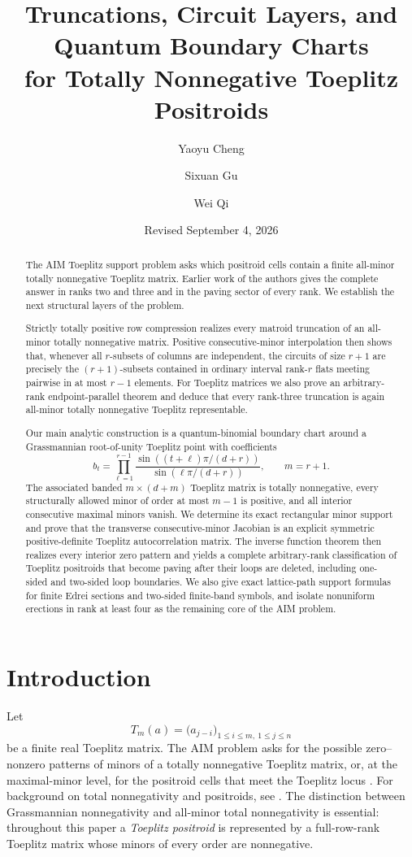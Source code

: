 \documentclass[11pt]{amsart}
\title[Toeplitz positroid truncations and charts]
{Truncations, Circuit Layers, and Quantum Boundary Charts\\
for Totally Nonnegative Toeplitz Positroids}
\author{Yaoyu Cheng}
\author{Sixuan Gu}
\author{Wei Qi}
\date{Revised September 4, 2026}
\theoremstyle{definition}
\theoremstyle{remark}
\begin{document}
\begin{abstract}
The AIM Toeplitz support problem asks which positroid cells contain a finite all-minor totally nonnegative Toeplitz matrix.  Earlier work of the authors gives the complete answer in ranks two and three and in the paving sector of every rank.  We establish the next structural layers of the problem.

Strictly totally positive row compression realizes every matroid truncation of an all-minor totally nonnegative matrix.  Positive consecutive-minor interpolation then shows that, whenever all $r$-subsets of columns are independent, the circuits of size $r+1$ are precisely the $(r+1)$-subsets contained in ordinary interval rank-$r$ flats meeting pairwise in at most $r-1$ elements.  For Toeplitz matrices we also prove an arbitrary-rank endpoint-parallel theorem and deduce that every rank-three truncation is again all-minor totally nonnegative Toeplitz representable.

Our main analytic construction is a quantum-binomial boundary chart around a Grassmannian root-of-unity Toeplitz point with coefficients
\[
 b_t=\prod_{\ell=1}^{r-1}\frac{\sin((t+\ell)\pi/(d+r))}{\sin(\ell\pi/(d+r))},
 \qquad m=r+1.
\]
The associated banded $m\times(d+m)$ Toeplitz matrix is totally nonnegative, every structurally allowed minor of order at most $m-1$ is positive, and all interior consecutive maximal minors vanish.  We determine its exact rectangular minor support and prove that the transverse consecutive-minor Jacobian is an explicit symmetric positive-definite Toeplitz autocorrelation matrix.  The inverse function theorem then realizes every interior zero pattern and yields a complete arbitrary-rank classification of Toeplitz positroids that become paving after their loops are deleted, including one-sided and two-sided loop boundaries.  We also give exact lattice-path support formulas for finite Edrei sections and two-sided finite-band symbols, and isolate nonuniform erections in rank at least four as the remaining core of the AIM problem.
\end{abstract}

\maketitle
\section{Introduction}

Let
\[
 T_m(a)=\bigl(a_{j-i}\bigr)_{1\le i\le m,\ 1\le j\le n}
\]
be a finite real Toeplitz matrix.  The AIM problem asks for the possible zero--nonzero patterns of minors of a totally nonnegative Toeplitz matrix, or, at the maximal-minor level, for the positroid cells that meet the Toeplitz locus \cite{AIM}.  For background on total nonnegativity and positroids, see \cite{FallatJohnson,Postnikov}.  The distinction between Grassmannian nonnegativity and all-minor total nonnegativity is essential: throughout this paper a \emph{Toeplitz positroid} is represented by a full-row-rank Toeplitz matrix whose minors of every order are nonnegative.
\end{document}
